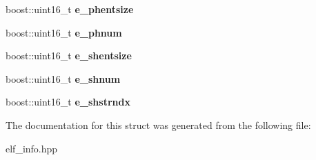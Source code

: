 \begin{DoxyCompactItemize}
\item 
\mbox{\label{a01388_aae8978ff0f2a20896b3c1ed34dc0793e}} 
boost\+::uint16\+\_\+t {\bfseries e\+\_\+phentsize}
\item 
\mbox{\label{a01388_af1962363e104e15e4635066806e52a00}} 
boost\+::uint16\+\_\+t {\bfseries e\+\_\+phnum}
\item 
\mbox{\label{a01388_a9d22ea8279a4c31365059d2ebe3bac56}} 
boost\+::uint16\+\_\+t {\bfseries e\+\_\+shentsize}
\item 
\mbox{\label{a01388_a610b772eda5456c9a9ab83537caef750}} 
boost\+::uint16\+\_\+t {\bfseries e\+\_\+shnum}
\item 
\mbox{\label{a01388_acae2be4b1e8d9766b5f9aaf32d5e7ca4}} 
boost\+::uint16\+\_\+t {\bfseries e\+\_\+shstrndx}
\end{DoxyCompactItemize}


The documentation for this struct was generated from the following file\+:\begin{DoxyCompactItemize}
\item 
elf\+\_\+info.\+hpp\end{DoxyCompactItemize}
